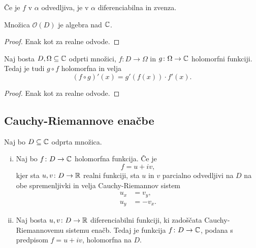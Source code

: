 \begin{trditev}
Če je $f$ v $\alpha$ odvedljiva, je v $\alpha$ diferenciabilna in
zvenza.
\end{trditev}

\obvs

\begin{trditev}
Množica $\mathcal{O}(D)$ je algebra nad $\mathbb{C}$.
\end{trditev}

\begin{proof}
Enak kot za realne odvode.
\end{proof}

\begin{trditev}
Naj bosta $D, \Omega \subseteq \mathbb{C}$ odprti množici,
$f \colon D \to \Omega$ in $g \colon \Omega \to \mathbb{C}$ holomorfni
funkciji. Tedaj je tudi $g \circ f$ holomorfna in velja
\[
(f \circ g)'(x) = g'(f(x)) \cdot f'(x).
\]
\end{trditev}

\begin{proof}
Enak kot za realne odvode.
\end{proof}

\newpage

\subsection{Cauchy-Riemannove enačbe}


\begin{izrek}
Naj bo $D \subseteq \mathbb{C}$ odprta množica.

\begin{enumerate}[i)]
\item Naj bo $f \colon D \to \mathbb{C}$ holomorfna funkcija. Če je
\[
f = u + iv,
\]
kjer sta $u, v \colon D \to \mathbb{R}$ realni funkciji, sta $u$ in $v$
parcialno odvedljivi na $D$ na obe spremenljivki in velja 
Cauchy-Riemannov sistem
\begin{align*}
u_x &= v_y,
\\
u_y &= -v_x.
\end{align*}
\item Naj bosta $u, v \colon D \to \mathbb{R}$ diferenciabilni funkciji, ki
zadoščata Cauchy-Riemannovemu sistemu enačb. Tedaj je funkcija
$f \colon D \to \mathbb{C}$, podana s predpisom $f = u + iv$, holomorfna na
$D$.
\end{enumerate}
\end{izrek}

